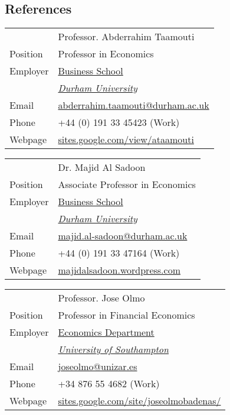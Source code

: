 \documentclass[margin,line,pifont,palatino,courier]{res}
\begin{document}
\begin{resume}
\hrulefill

\section{\sc \bf References}

\begin{tabular}{@{}p{0.8in}p{4in}}
& Professor. Abderrahim Taamouti \\
Position&Professor in Economics\\
Employer&\href{https://www.dur.ac.uk/business/}{Business School}\\
&\href{https://www.dur.ac.uk/}{\textit{Durham University}}\\
Email & \href{mailto: abderrahim.taamouti@durham.ac.uk}{abderrahim.taamouti@durham.ac.uk}\\
Phone &+44 (0) 191 33 45423 (Work)\\
Webpage&\href{https://sites.google.com/view/ataamouti}{sites.google.com/view/ataamouti}
\end{tabular}

\begin{tabular}{@{}p{0.8in}p{4in}}
& Dr. Majid Al Sadoon\\
Position&Associate Professor in Economics\\
Employer&\href{https://www.dur.ac.uk/business/}{Business School}\\
&\href{https://www.dur.ac.uk/}{\textit{Durham University}}\\
Email & \href{mailto:majid.al-sadoon@durham.ac.uk}{majid.al-sadoon@durham.ac.uk}\\
Phone &+44 (0) 191 33 47164 (Work)\\
Webpage&\href{https://majidalsadoon.wordpress.com/}{majidalsadoon.wordpress.com}
\end{tabular}


\begin{tabular}{@{}p{0.8in}p{4in}}
& Professor. Jose Olmo\\
Position&Professor in Financial Economics\\
Employer&\href{https://www.southampton.ac.uk/economics/}{Economics Department}\\
&\href{https://www.southampton.ac.uk/}{\textit{University of Southampton}}\\
Email & \href{mailto: joseolmo@unizar.es}{ joseolmo@unizar.es}\\
Phone &+34 876 55 4682 (Work)\\
Webpage&\href{https://sites.google.com/site/joseolmobadenas/}{sites.google.com/site/joseolmobadenas/}
\end{tabular}



\end{resume}
\end{document}
